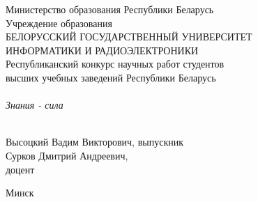 \begin{titlepage}
  \begin{center}
    Министерство образования Республики Беларусь\\[1em]
    Учреждение образования\\
    БЕЛОРУССКИЙ ГОСУДАРСТВЕННЫЙ УНИВЕРСИТЕТ \\
    ИНФОРМАТИКИ И РАДИОЭЛЕКТРОНИКИ \\[3em]

    Республиканский конкурс научных работ студентов\\
    высших учебных заведений Республики Беларусь \\[3em]

    \workSection{} \\[3em]

    \textit{Знания - сила} \\[3em]

    \textbf{\thesis{}} \\[7em]

    \begin{flushright}
      \begin{minipage}{0.4\textwidth}
        Высоцкий Вадим Викторович, выпускник \\[1em]
      
        Сурков Дмитрий Андреевич,\\
        доцент
      \end{minipage}
    \end{flushright}

    
    \vfill
    {\normalsize Минск \currentYear{}}
  \end{center}
\end{titlepage}
